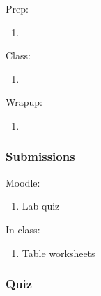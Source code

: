 \documentclass[12pt]{article}
\begin{document}
Prep:
\begin{enumerate}
\item
\end{enumerate}

\noindent
Class:
\begin{enumerate}
\item
\end{enumerate}

\noindent
Wrapup:
\begin{enumerate}
\item
\end{enumerate}


\subsubsection{Submissions}

Moodle:
\begin{enumerate}
\item Lab quiz
\end{enumerate}

\noindent
In-class:
\begin{enumerate}
\item Table worksheets
\end{enumerate}


\subsubsection{Quiz}
\end{document}

